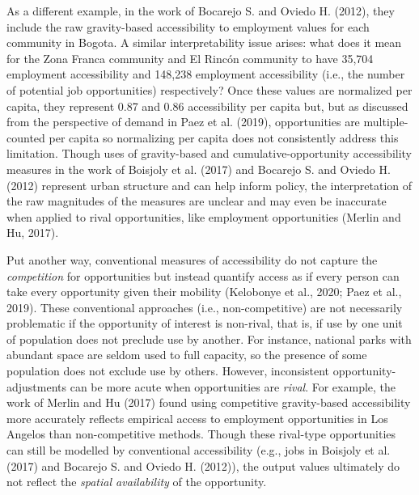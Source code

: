 \documentclass[]{elsarticle} %
\begin{document}
As a different example, in the work of Bocarejo S. and Oviedo H. (2012),
they include the raw gravity-based accessibility to employment values
for each community in Bogota. A similar interpretability issue arises:
what does it mean for the Zona Franca community and El Rincón community
to have 35,704 employment accessibility and 148,238 employment
accessibility (i.e., the number of potential job opportunities)
respectively? Once these values are normalized per capita, they
represent 0.87 and 0.86 accessibility per capita but, but as discussed
from the perspective of demand in Paez et al. (2019), opportunities are
multiple-counted per capita so normalizing per capita does not
consistently address this limitation. Though uses of gravity-based and
cumulative-opportunity accessibility measures in the work of Boisjoly et
al. (2017) and Bocarejo S. and Oviedo H. (2012) represent urban
structure and can help inform policy, the interpretation of the raw
magnitudes of the measures are unclear and may even be inaccurate when
applied to rival opportunities, like employment opportunities (Merlin
and Hu, 2017).

Put another way, conventional measures of accessibility do not capture
the \emph{competition} for opportunities but instead quantify access as
if every person can take every opportunity given their mobility
(Kelobonye et al., 2020; Paez et al., 2019). These conventional
approaches (i.e., non-competitive) are not necessarily problematic if
the opportunity of interest is non-rival, that is, if use by one unit of
population does not preclude use by another. For instance, national
parks with abundant space are seldom used to full capacity, so the
presence of some population does not exclude use by others. However,
inconsistent opportunity-adjustments can be more acute when
opportunities are \emph{rival}. For example, the work of Merlin and Hu
(2017) found using competitive gravity-based accessibility more
accurately reflects empirical access to employment opportunities in Los
Angelos than non-competitive methods. Though these rival-type
opportunities can still be modelled by conventional accessibility (e.g.,
jobs in Boisjoly et al. (2017) and Bocarejo S. and Oviedo H. (2012)),
the output values ultimately do not reflect the \emph{spatial
availability} of the opportunity.
\end{document}
